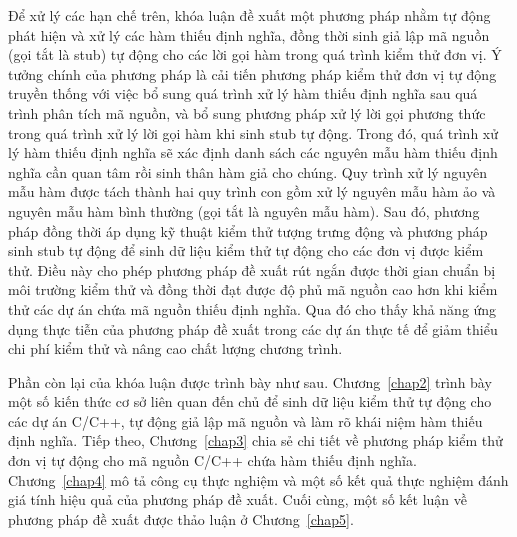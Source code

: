 Để xử lý các hạn chế trên, khóa luận đề xuất một phương pháp nhằm tự động phát hiện và xử lý các hàm thiếu định nghĩa, đồng thời sinh giả lập mã nguồn (gọi tắt là stub) tự động cho các lời gọi hàm trong quá trình kiểm thử đơn vị. Ý tưởng chính của phương pháp là cải tiến phương pháp kiểm thử đơn vị tự động truyền thống với việc bổ sung quá trình xử lý hàm thiếu định nghĩa sau quá trình phân tích mã nguồn, và bổ sung phương pháp xử lý lời gọi phương thức trong quá trình xử lý lời gọi hàm khi sinh stub tự động. Trong đó, quá trình xử lý hàm thiếu định nghĩa sẽ xác định danh sách các nguyên mẫu hàm thiếu định nghĩa cần quan tâm rồi sinh thân hàm giả cho chúng. Quy trình xử lý nguyên mẫu hàm được tách thành hai quy trình con gồm xử lý nguyên mẫu hàm ảo và nguyên mẫu hàm bình thường (gọi tắt là nguyên mẫu hàm). Sau đó, phương pháp đồng thời áp dụng kỹ thuật kiểm thử tượng trưng động và phương pháp sinh stub tự động để sinh dữ liệu kiểm thử tự động cho các đơn vị được kiểm thử. Điều này cho phép phương pháp đề xuất rút ngắn được thời gian chuẩn bị môi trường kiểm thử và đồng thời đạt được độ phủ mã nguồn cao hơn khi kiểm thử các dự án chứa mã nguồn thiếu định nghĩa. Qua đó cho thấy khả năng ứng dụng thực tiễn của phương pháp đề xuất trong các dự án thực tế để giảm thiểu chi phí kiểm thử và nâng cao chất lượng chương trình.

Phần còn lại của khóa luận được trình bày như sau. Chương~\ref{chap2} trình bày một số kiến thức cơ sở liên quan đến chủ để sinh dữ liệu kiểm thử tự động cho các dự án C/C++, tự động giả lập mã nguồn và làm rõ khái niệm hàm thiếu định nghĩa. Tiếp theo, Chương~\ref{chap3} chia sẻ chi tiết về phương pháp kiểm thử đơn vị tự động cho mã nguồn C/C++ chứa hàm thiếu định nghĩa. Chương~\ref{chap4} mô tả công cụ thực nghiệm và một số kết quả thực nghiệm đánh giá tính hiệu quả của phương pháp đề xuất. Cuối cùng, một số kết luận về phương pháp đề xuất được thảo luận ở Chương~\ref{chap5}. 